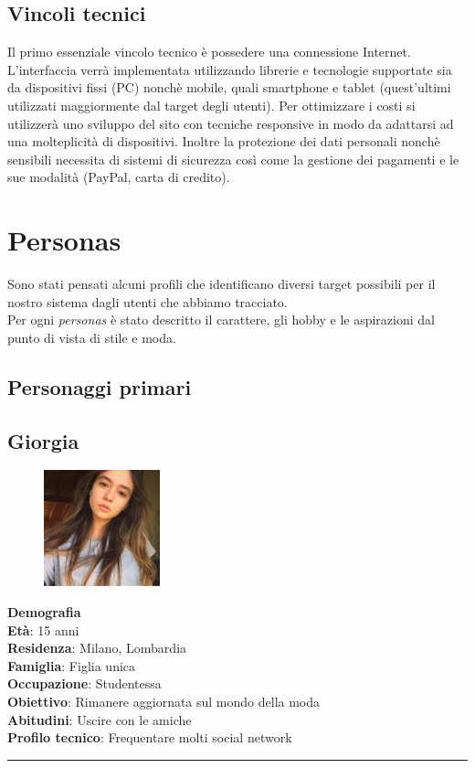 \documentclass[12pt,a4paper]{report}
\begin{document}
\subsection{Vincoli tecnici}
Il primo essenziale vincolo tecnico è possedere una connessione Internet. L'interfaccia verrà implementata utilizzando librerie e tecnologie supportate sia da dispositivi fissi (PC) nonchè mobile, quali smartphone e tablet (quest'ultimi utilizzati maggiormente dal target degli utenti). Per ottimizzare i costi si utilizzerà uno sviluppo del sito con tecniche responsive in modo da adattarsi ad una molteplicità di dispositivi. Inoltre la protezione dei dati personali nonchè sensibili necessita di sistemi di sicurezza così come la gestione dei pagamenti e le sue modalità (PayPal, carta di credito).
\section{Personas}
Sono stati pensati alcuni profili che identificano diversi target possibili per il nostro sistema dagli utenti che abbiamo tracciato.\\
Per ogni \textit{personas} è stato descritto il carattere, gli hobby e le aspirazioni dal punto di vista di stile e moda.
\subsection{Personaggi primari}
\subsection*{Giorgia}
\begin{figure}
  \centering
    \includegraphics[width=0.3\textwidth]{"Images Latex/Personas/Giorgia"}
\end{figure}
\textbf{Demografia}\\
\indent \textbf{Età}: 15 anni\\
\indent \textbf{Residenza}: Milano, Lombardia\\
\indent \textbf{Famiglia}: Figlia unica\\
\indent \textbf{Occupazione}: Studentessa\\
\textbf{Obiettivo}: Rimanere aggiornata sul mondo della moda\\
\textbf{Abitudini}: Uscire con le amiche\\
\textbf{Profilo tecnico}: Frequentare molti social network\\
\rule{\textwidth}{0.5pt}
\end{document}
